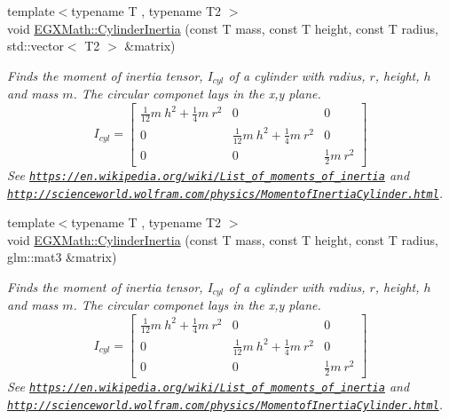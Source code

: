 \begin{DoxyCompactItemize}
{\footnotesize template$<$typename T , typename T2 $>$ }\\void \mbox{\hyperlink{group___e_g_x_math-_geometry-3_d-_cylinder_gac46dd57839cb2157d1bb6dd430d781ec}{E\+G\+X\+Math\+::\+Cylinder\+Inertia}} (const T mass, const T height, const T radius, std\+::vector$<$ T2 $>$ \&matrix)
\begin{DoxyCompactList}\small\item\em Finds the moment of inertia tensor, $I_{cyl}$ of a cylinder with radius, $r$, height, $h$ and mass $m$. The circular componet lays in the x,y plane. \[ I_{cyl}=\begin{bmatrix} \frac{1}{12}m\ h^2 + \frac{1}{4}m\ r^2 & 0 & 0\\ 0 & \frac{1}{12}m\ h^2 + \frac{1}{4}m\ r^2 & 0\\ 0 & 0 & \frac{1}{2}m\ r^2 \end{bmatrix} \] See \href{https://en.wikipedia.org/wiki/List_of_moments_of_inertia}{\tt https\+://en.\+wikipedia.\+org/wiki/\+List\+\_\+of\+\_\+moments\+\_\+of\+\_\+inertia} and \href{http://scienceworld.wolfram.com/physics/MomentofInertiaCylinder.html}{\tt http\+://scienceworld.\+wolfram.\+com/physics/\+Momentof\+Inertia\+Cylinder.\+html}. \end{DoxyCompactList}\item 
{\footnotesize template$<$typename T , typename T2 $>$ }\\void \mbox{\hyperlink{group___e_g_x_math-_geometry-3_d-_cylinder_ga5d9256549303e88a49b72e3d4c2c4a6d}{E\+G\+X\+Math\+::\+Cylinder\+Inertia}} (const T mass, const T height, const T radius, glm\+::mat3 \&matrix)
\begin{DoxyCompactList}\small\item\em Finds the moment of inertia tensor, $I_{cyl}$ of a cylinder with radius, $r$, height, $h$ and mass $m$. The circular componet lays in the x,y plane. \[ I_{cyl}=\begin{bmatrix} \frac{1}{12}m\ h^2 + \frac{1}{4}m\ r^2 & 0 & 0\\ 0 & \frac{1}{12}m\ h^2 + \frac{1}{4}m\ r^2 & 0\\ 0 & 0 & \frac{1}{2}m\ r^2 \end{bmatrix} \] See \href{https://en.wikipedia.org/wiki/List_of_moments_of_inertia}{\tt https\+://en.\+wikipedia.\+org/wiki/\+List\+\_\+of\+\_\+moments\+\_\+of\+\_\+inertia} and \href{http://scienceworld.wolfram.com/physics/MomentofInertiaCylinder.html}{\tt http\+://scienceworld.\+wolfram.\+com/physics/\+Momentof\+Inertia\+Cylinder.\+html}. \end{DoxyCompactList}\end{DoxyCompactItemize}


